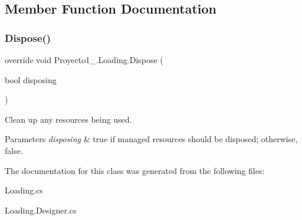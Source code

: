 \subsection{Member Function Documentation}
\mbox{\label{class_proyecto1__1096917_1_1_loading_a377074dd9fbc481999dd330adf7f69a0}} 
\subsubsection{\texorpdfstring{Dispose()}{Dispose()}}
{\footnotesize\ttfamily override void Proyecto1\+\_.\+Loading.\+Dispose (\begin{DoxyParamCaption}\item[{bool}]{disposing }\end{DoxyParamCaption})\hspace{0.3cm}{\ttfamily [protected]}}



Clean up any resources being used. 


\begin{DoxyParams}{Parameters}
{\em disposing} & true if managed resources should be disposed; otherwise, false.\\
\hline
\end{DoxyParams}


The documentation for this class was generated from the following files\+:\begin{DoxyCompactItemize}
\item 
Loading.\+cs\item 
Loading.\+Designer.\+cs\end{DoxyCompactItemize}
